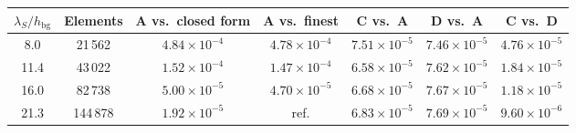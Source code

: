\begin{tabular}{ccccccc}
\toprule
$\lambda_S/h_{\mathrm{bg}}$ & Elements & A vs.\ closed form & A vs.\ finest & C vs.\ A & D vs.\ A & C vs.\ D \\
\midrule
8.0 & 21\,562 & $4.84\times 10^{-4}$ & $4.78\times 10^{-4}$ & $7.51\times 10^{-5}$ & $7.46\times 10^{-5}$ & $4.76\times 10^{-5}$ \\
11.4 & 43\,022 & $1.52\times 10^{-4}$ & $1.47\times 10^{-4}$ & $6.58\times 10^{-5}$ & $7.62\times 10^{-5}$ & $1.84\times 10^{-5}$ \\
16.0 & 82\,738 & $5.00\times 10^{-5}$ & $4.70\times 10^{-5}$ & $6.68\times 10^{-5}$ & $7.67\times 10^{-5}$ & $1.18\times 10^{-5}$ \\
21.3 & 144\,878 & $1.92\times 10^{-5}$ & ref. & $6.83\times 10^{-5}$ & $7.69\times 10^{-5}$ & $9.60\times 10^{-6}$ \\
\bottomrule
\end{tabular}
